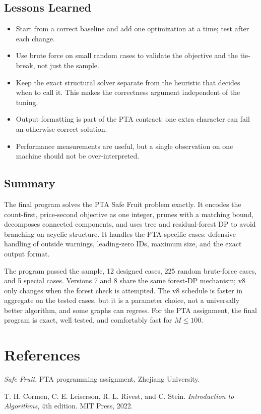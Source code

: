 \documentclass[12pt,a4paper]{report}
\begin{document}
\section{Lessons Learned}

\begin{itemize}
\item Start from a correct baseline and add one optimization at a time; test
      after each change.
\item Use brute force on small random cases to validate the objective and the
      tie-break, not just the sample.
\item Keep the exact structural solver separate from the heuristic that decides
      when to call it.  This makes the correctness argument independent of the
      tuning.
\item Output formatting is part of the PTA contract: one extra character can
      fail an otherwise correct solution.
\item Performance measurements are useful, but a single observation on one
      machine should not be over-interpreted.
\end{itemize}

\section{Summary}

The final program solves the PTA Safe Fruit problem exactly.  It encodes the
count-first, price-second objective as one integer, prunes with a matching
bound, decomposes connected components, and uses tree and residual-forest DP to
avoid branching on acyclic structure.  It handles the PTA-specific cases:
defensive handling of outside warnings, leading-zero IDs, maximum size, and the
exact output format.

The program passed the sample, 12 designed cases, 225 random brute-force cases,
and 5 special cases.  Versions 7 and 8 share the same forest-DP mechanism; v8
only changes when the forest check is attempted.  The v8 schedule is faster in
aggregate on the tested cases, but it is a parameter choice, not a universally
better algorithm, and some graphs can regress.  For the PTA assignment, the
final program is exact, well tested, and comfortably fast for $M\le100$.

\chapter*{References}
\begin{enumerate}[label={[\arabic*]}]
  \item \textit{Safe Fruit}, PTA programming assignment, Zhejiang University.
  \item T. H. Cormen, C. E. Leiserson, R. L. Rivest, and C. Stein.
        \textit{Introduction to Algorithms}, 4th edition. MIT Press, 2022.
\end{enumerate}
\end{document}
